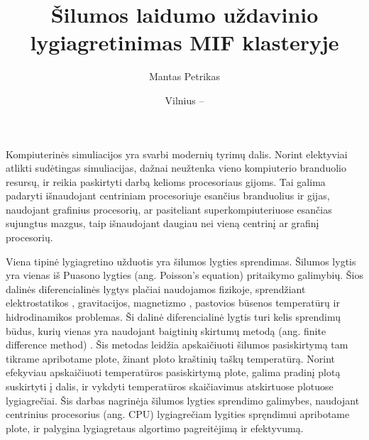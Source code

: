 \documentclass{VUMIFPSbakalaurinis}
\title{Šilumos laidumo uždavinio lygiagretinimas MIF klasteryje}
\author{Mantas Petrikas}
\date{Vilnius – \the\year}
\begin{document}
\maketitle



\tableofcontents



Kompiuterinės simuliacijos yra svarbi modernių tyrimų dalis. 
Norint elektyviai atlikti sudėtingas simuliacijas, dažnai neužtenka vieno kompiuterio branduolio resursų, ir reikia paskirtyti darbą kelioms procesoriaus gijoms.
Tai galima padaryti išnaudojant centriniam procesoriuje esančius branduolius ir gijas, naudojant grafinius procesorių, ar pasiteliant superkompiuteriuose esančias sujungtus mazgus, taip išnaudojant daugiau nei vieną  centrinį ar grafinį procesorių.

Viena tipinė lygiagretino užduotis yra šilumos lygties sprendimas. 
Šilumos lygtis yra vienas iš Puasono lygties (ang. Poisson's equation) pritaikymo galimybių. 
Šios dalinės diferencialinės lygtys plačiai naudojamos fizikoje, sprendžiant elektrostatikos \cite{house2008analytic}, gravitacijos, magnetizmo \cite{blakely1996potential}, pastovios būsenos temperatūrų \cite {berntsson2001numerical} ir hidrodinamikos \cite{kadanoff1985simulating} problemas. 
Ši dalinė diferencialinė lygtis turi kelis sprendimų būdus, kurių vienas yra naudojant baigtinių skirtumų metodą (ang. finite difference method) \cite{yoon2015analyses}.
Šis metodas leidžia apskaičiuoti šilumos pasiskirtymą tam tikrame apribotame plote, žinant ploto kraštinių taškų temperatūrą.
Norint efekyviau apskaičiuoti temperatūros pasiskirtymą plote, galima pradinį plotą suskirtyti į dalis, ir vykdyti temperatūros skaičiavimus atskirtuose plotuose lygiagrečiai.
Šis darbas nagrinėja šilumos lygties sprendimo galimybes, naudojant centrinius procesorius (ang. CPU) lygiagrečiam lygities spręndimui apribotame plote, ir palygina lygiagretaus algortimo pagreitėjimą ir efektyvumą. 




\end{document}
